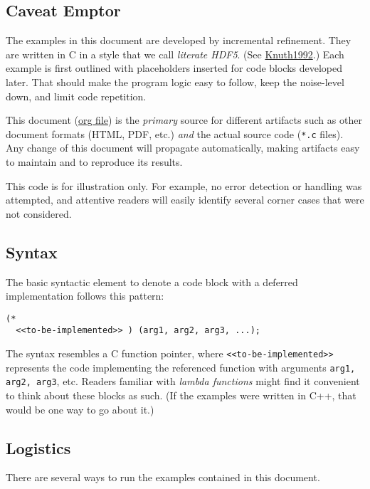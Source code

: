 \documentclass[a4paper, 12pt]{article}
\begin{document}
\subsection{Caveat Emptor}
\label{sec:org201f89f}

The examples in this document are developed by incremental refinement. They
are written in C in a style that we call \emph{literate HDF5}. (See \href{https://en.wikipedia.org/wiki/Literate\_programming}{Knuth1992}.)
Each example is first outlined with placeholders inserted for code blocks
developed later. That should make the program logic easy to follow, keep the
noise-level down, and limit code repetition.

This document (\href{https://www.jstatsoft.org/article/view/v046i03}{org file}) is the \emph{primary} source for different artifacts
such as other document formats (HTML, PDF, etc.) \emph{and} the actual source
code (\texttt{*.c} files). Any change of this document will propagate
automatically, making artifacts easy to maintain and to reproduce its
results.

This code is for illustration only. For example, no error detection or
handling was attempted, and attentive readers will easily identify several
corner cases that were not considered.

\subsection{Syntax}
\label{sec:orgbb0cf18}

The basic syntactic element to denote a code block with a deferred
implementation follows this pattern:

\begin{verbatim}
(*
  <<to-be-implemented>> ) (arg1, arg2, arg3, ...);
\end{verbatim}

The syntax resembles a C function pointer, where \texttt{<<to-be-implemented>>}
represents the code implementing the referenced function with arguments
\texttt{arg1, arg2, arg3}, etc. Readers familiar with \emph{lambda functions} might find
it convenient to think about these blocks as such. (If the examples were
written in C++, that would be one way to go about it.)

\subsection{Logistics}
\label{sec:orgd6e565b}

There are several ways to run the examples contained in this document.
\end{document}
